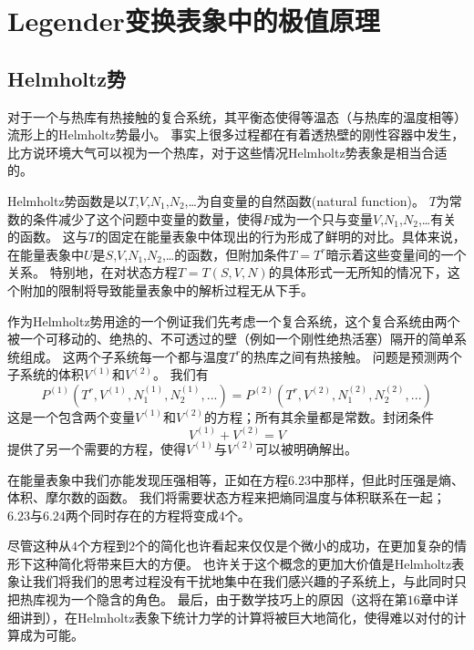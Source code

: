 \chapter{Legender变换表象中的极值原理}
\label{chap6}

\section{Helmholtz势}
\label{sec6.2}

对于一个与热库有热接触的复合系统，其平衡态使得等温态（与热库的温度相等）流形上的Helmholtz势最小。
事实上很多过程都在有着透热壁的刚性容器中发生，比方说环境大气可以视为一个热库，对于这些情况Helmholtz势表象是相当合适的。

 Helmholtz势函数是以$T$,$V$,$N_1$,$N_2$,…为自变量的自然函数(natural function)。
$T$为常数的条件减少了这个问题中变量的数量，使得$F$成为一个只与变量$V$,$N_1$,$N_2$,…有关的函数。
这与$T$的固定在能量表象中体现出的行为形成了鲜明的对比。具体来说，在能量表象中$U$是$S$,$V$,$N_1$,$N_2$,…的函数，但附加条件$T=T^r$暗示着这些变量间的一个关系。
特别地，在对状态方程$T=T(S, V, N)$的具体形式一无所知的情况下，这个附加的限制将导致能量表象中的解析过程无从下手。

作为Helmholtz势用途的一个例证我们先考虑一个复合系统，这个复合系统由两个被一个可移动的、绝热的、不可透过的壁（例如一个刚性绝热活塞）隔开的简单系统组成。
这两个子系统每一个都与温度$T^r$的热库之间有热接触。
问题是预测两个子系统的体积$V^{(1)}$和$V^{(2)}$。
我们有
\begin{equation}
\label{equ6.23}
P^{(1)}\left(T^r, V^{(1)}, N_1^{(1)}, N_2^{(1)}, ...\right)=P^{(2)}\left(T^r, V^{(2)}, N_1^{(2)}, N_2^{(2)}, ...\right)
\end{equation}
这是一个包含两个变量$V^{(1)}$和$V^{(2)}$的方程；所有其余量都是常数。封闭条件
\begin{equation}
\label{equ6.24}
V^{(1)}+V^{(2)}=V
\end{equation}
提供了另一个需要的方程，使得$V^{(1)}$与$V^{(2)}$可以被明确解出。

在能量表象中我们亦能发现压强相等，正如在方程$6.23$中那样，但此时压强是熵、体积、摩尔数的函数。
我们将需要状态方程来把熵同温度与体积联系在一起；$6.23$与$6.24$两个同时存在的方程将变成$4$个。

尽管这种从$4$个方程到$2$个的简化也许看起来仅仅是个微小的成功，在更加复杂的情形下这种简化将带来巨大的方便。
也许关于这个概念的更加大价值是Helmholtz表象让我们将我们的思考过程没有干扰地集中在我们感兴趣的子系统上，与此同时只把热库视为一个隐含的角色。
最后，由于数学技巧上的原因（这将在第$16$章中详细讲到），在Helmholtz表象下统计力学的计算将被巨大地简化，使得难以对付的计算成为可能。

